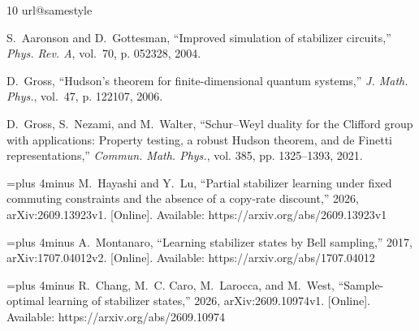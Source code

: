 \documentclass[journal,twocolumn]{IEEEtran}
\theoremstyle{definition}
\theoremstyle{plain}
\begin{document}
\clearpage
\begin{thebibliography}{10}
\providecommand{\url}[1]{#1}
\csname url@samestyle\endcsname
\providecommand{\newblock}{\relax}
\providecommand{\bibinfo}[2]{#2}
\providecommand{\BIBentrySTDinterwordspacing}{\spaceskip=0pt\relax}
\providecommand{\BIBentryALTinterwordstretchfactor}{4}
\providecommand{\BIBentryALTinterwordspacing}{\spaceskip=\fontdimen2\font plus
\BIBentryALTinterwordstretchfactor\fontdimen3\font minus \fontdimen4\font\relax}
\providecommand{\BIBforeignlanguage}[2]{{%
\expandafter\ifx\csname l@#1\endcsname\relax
\typeout{** WARNING: IEEEtran.bst: No hyphenation pattern has been}%
\typeout{** loaded for the language `#1'. Using the pattern for}%
\typeout{** the default language instead.}%
\else
\language=\csname l@#1\endcsname
\fi
#2}}
\providecommand{\BIBdecl}{\relax}
\BIBdecl

S.~Aaronson and D.~Gottesman, ``Improved simulation of stabilizer circuits,'' \emph{Phys. Rev. A}, vol.~70, p. 052328, 2004.

D.~Gross, ``{Hudson}'s theorem for finite-dimensional quantum systems,'' \emph{J. Math. Phys.}, vol.~47, p. 122107, 2006.

D.~Gross, S.~Nezami, and M.~Walter, ``{Schur--Weyl} duality for the {Clifford} group with applications: Property testing, a robust {Hudson} theorem, and {de Finetti} representations,'' \emph{Commun. Math. Phys.}, vol. 385, pp. 1325--1393, 2021.

\BIBentryALTinterwordspacing
M.~Hayashi and Y.~Lu, ``Partial stabilizer learning under fixed commuting constraints and the absence of a copy-rate discount,'' 2026, arXiv:2609.13923v1. [Online]. Available: \url{https://arxiv.org/abs/2609.13923v1}
\BIBentrySTDinterwordspacing

\BIBentryALTinterwordspacing
A.~Montanaro, ``Learning stabilizer states by {Bell} sampling,'' 2017, arXiv:1707.04012v2. [Online]. Available: \url{https://arxiv.org/abs/1707.04012}
\BIBentrySTDinterwordspacing

\BIBentryALTinterwordspacing
R.~Chang, M.~C. Caro, M.~Larocca, and M.~West, ``Sample-optimal learning of stabilizer states,'' 2026, arXiv:2609.10974v1. [Online]. Available: \url{https://arxiv.org/abs/2609.10974}
\BIBentrySTDinterwordspacing


\end{thebibliography}
\end{document}
